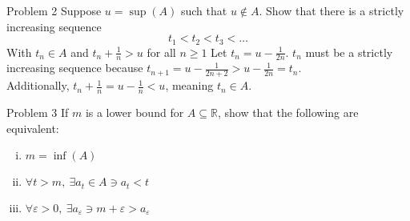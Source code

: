 \documentclass[10pt]{extarticle}
\newcommand{\R}{\mathbb{R}}
\begin{document}
  \begin{problem}{Problem 2}
    Suppose $u = \sup(A)$ such that $u\notin A$. Show that there is a strictly increasing sequence
    \[
      t_1 < t_2 < t_3 < \dots
    \] 
    With $t_n \in A$ and $t_n + \frac{1}{n} > u$ for all $n \geq 1$
    \tcblower
    Let $t_n = u-\frac{1}{2n}$. $t_n$ must be a strictly increasing sequence because $t_{n+1} = u - \frac{1}{2n+2} > u-\frac{1}{2n} = t_n$.\\

    Additionally, $t_n + \frac{1}{n} = u-\frac{1}{n} < u$, meaning $t_n\in A$.
  \end{problem}
  \begin{problem}{Problem 3}
    If $m$ is a lower bound for $A\subseteq \R$, show that the following are equivalent:
    \begin{enumerate}[(i)]
      \item $m = \inf(A)$
      \item $\forall t > m,~\exists a_t\in A \ni a_t < t$
      \item $\forall \varepsilon > 0,~\exists a_{\varepsilon} \ni m+\varepsilon > a_{\varepsilon}$
    \end{enumerate}
  \end{problem}
\end{document}
